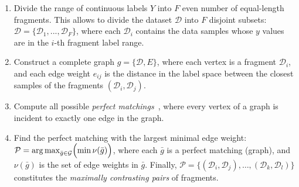 \documentclass{article}
\DeclareMathOperator*{\argmax}{arg\,max}
\theoremstyle{plain}
\theoremstyle{definition}
\theoremstyle{remark}
\begin{document}
\begin{enumerate}[leftmargin=*]
\item Divide the range of continuous labels $Y$ into $F$ even number of equal-length fragments.
  This allows to divide the dataset $\mathcal{D}$ into $F$ disjoint subsets: $\mathcal{D} = \{\mathcal{D}_1, ... ,\mathcal{D}_F \}$, where 
    each $\mathcal{D}_i$ contains the data samples whose $y$ values are in the $i$-th fragment label range. %
\item Construct a complete graph $g= \{\mathcal{D}, E\}$, where each vertex is a  fragment $\mathcal{D}_i$, and each edge weight $e_{ij}$ is the distance in the label space between the closest samples of the fragments $(\mathcal{D}_i,\mathcal{D}_j)$. 
\item Compute all possible \textit{perfect matchings}~\citep{monfared16pm, gibbons85pm}, where every vertex of a graph is incident to exactly one edge in the graph.  
\item Find the perfect matching with the largest minimal edge weight: %
        $\mathcal{P} = \argmax_{\bar{g}\in \mathcal{G}}\Bigl(\min\nu(\bar{g})\Bigr)$,
    where each $\bar{g}$ is a perfect matching (graph), and  $\nu(\bar{g})$ is the set of edge weights in $\bar{g}$.
Finally, $\mathcal{P}=\{ (\mathcal{D}_i, \mathcal{D}_j), \ldots ,(\mathcal{D}_k, \mathcal{D}_l)\}$ constitutes the \textit{maximally contrasting pairs} of fragments. %
\end{enumerate}
\end{document}
